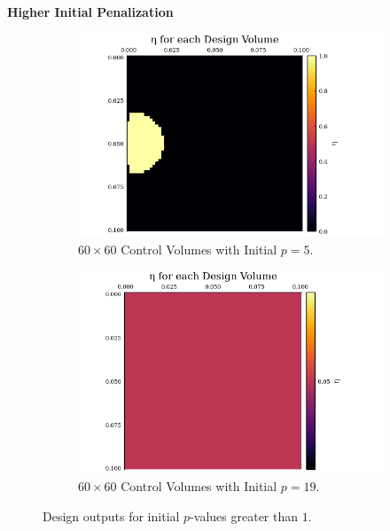 \documentclass[final]{beamer}
\begin{document}
\begin{frame}{\textbf{Higher Initial Penalization}}
	\begin{figure}
		\begin{subfigure}{0.45\textwidth}
			\includegraphics[width=1.1\linewidth]{60x60-start-p=5-1iters.png}
			\caption{$60\times 60$ Control Volumes with Initial $p=5$.}
			\label{fig:start_p=5}
		\end{subfigure}
		\begin{subfigure}{0.45\textwidth}
			\includegraphics[width=1.1\linewidth]{60x60-start-p=19-3iters.png}
			\caption{$60\times 60$ Control Volumes with Initial $p=19$.}
			\label{fig:start_p=19}
		\end{subfigure}
		\caption[Designs with Higher Initial $p$]{Design outputs for initial $p$-values greater than $1$.}
	\end{figure}
\end{frame}
\end{document}
